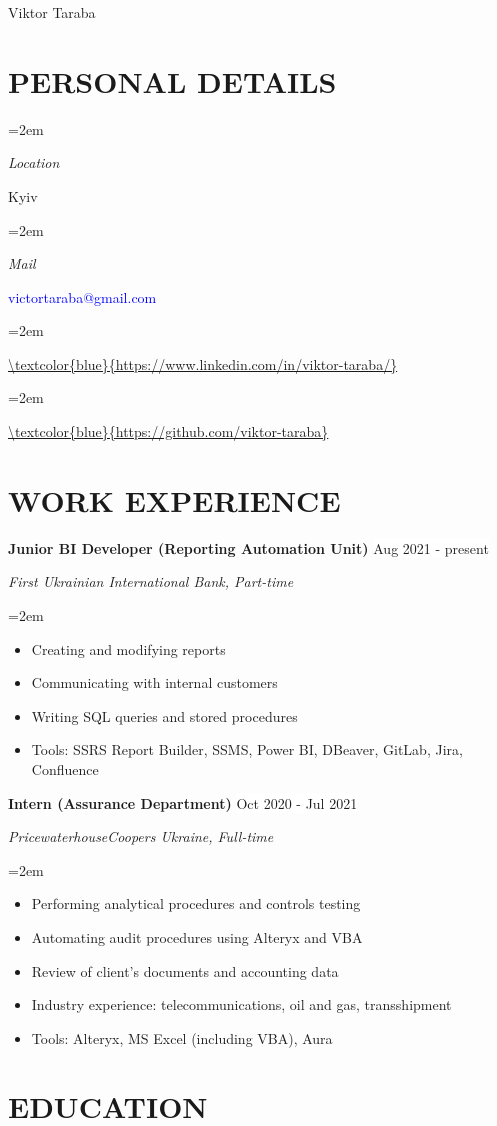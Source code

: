 \documentclass[paper=a4,fontsize=11pt]{scrartcl} %
\newlength{\spacebox}
\newcommand{\sepspace}{\vspace*{1em}}		%
\newcommand{\MyName}[1]{ %
		\Huge \usefont{OT1}{phv}{b}{n} \hfill #1
		\par \normalsize \normalfont}
\newcommand{\NewPart}[1]{\section*{\uppercase{#1}}}
\newcommand{\PersonalEntry}[2]{
		\noindent\hangindent=2em\hangafter=0 %
		\parbox{\spacebox}{        %
		\textit{#1}}		       %
		\hspace{1.5em} #2 \par}    %
\newcommand{\EducationEntry}[4]{
		\noindent \textbf{#1} \hfill      %
        \colorbox{White}{\color{Black}#2} \par  %
		\noindent \textit{#3} \par        %
		\noindent\hangindent=2em\hangafter=0 \small #4 %
		\normalsize \par}
\newcommand{\WorkEntry}[4]{				  %
		\noindent \textbf{#1} \hfill      %
		\colorbox{White}{\color{Black}#2} \par  %
		\noindent \textit{#3} \par              %
		\noindent\hangindent=2em\hangafter=0 \small #4 %
		\normalsize \par}
\begin{document}

\MyName{Viktor Taraba}

\NewPart{Personal details}{}

\PersonalEntry{Location}{Kyiv}
\PersonalEntry{Mail}{\textcolor{blue}{victortaraba@gmail.com}}
\PersonalEntry{\faLinkedin}{\url{\textcolor{blue}{https://www.linkedin.com/in/viktor-taraba/}}}
\PersonalEntry{\faGithub}{\url{\textcolor{blue}{https://github.com/viktor-taraba}}}
\NewPart{Work experience}{}

\WorkEntry{Junior BI Developer (Reporting Automation Unit)}{Aug 2021 - present}{First Ukrainian International Bank, Part-time}{ \begin{itemize} \setlength{\itemsep}{-1pt} \item Creating and modifying reports
\item Communicating with internal customers
\item Writing SQL queries and stored procedures \item[\textcolor{gray}{\textbullet}] Tools: SSRS Report Builder, SSMS, Power BI, DBeaver, GitLab, Jira, Confluence \end{itemize}}
\sepspace

\WorkEntry{Intern (Assurance Department)}{Oct 2020 - Jul 2021}{PricewaterhouseCoopers Ukraine, Full-time}{
\begin{itemize} \setlength{\itemsep}{-1pt} \item Performing analytical procedures and controls testing \item Automating audit procedures using Alteryx and VBA \item Review of client's documents and accounting data 
\item Industry experience: telecommunications, oil and gas, transshipment \item[\textcolor{gray}{\textbullet}] Tools: Alteryx, MS Excel (including VBA), Aura \end{itemize}}

\NewPart{Education}{}
\end{document}

